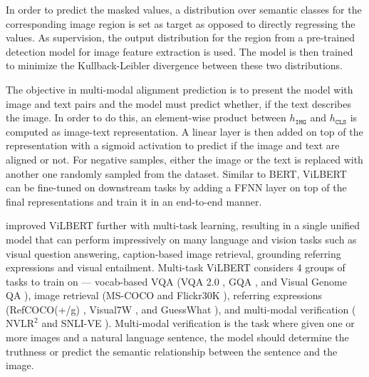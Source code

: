 \documentclass{article}
\begin{document}
In order to predict the masked values, a distribution over semantic classes for the corresponding image region is set as target as opposed to directly regressing the values. As supervision, the output distribution for the region from a pre-trained detection model for image feature extraction is used. The model is then trained to minimize the Kullback-Leibler divergence between these two distributions.

The objective in multi-modal alignment prediction is to present the model with image and text pairs and the model must predict whether, if the text describes the image. In order to do this, an element-wise product between $h_{\mathtt{IMG}}$ and $h_{\mathtt{CLS}}$ is computed as image-text representation. A linear layer is then added on top of the representation with a sigmoid activation to predict if the image and text are aligned or not. For negative samples, either the image or the text is replaced with another one randomly sampled from the dataset. Similar to BERT, ViLBERT can be fine-tuned on downstream tasks by adding a FFNN layer on top of the final representations and train it in an end-to-end manner.

\citet{lu2020multitask} improved ViLBERT further with multi-task learning, resulting in a single unified model that can perform impressively on many language and vision tasks such as visual question answering, caption-based image retrieval, grounding referring expressions and visual entailment. Multi-task ViLBERT considers 4 groups of tasks to train on --- vocab-based VQA (VQA 2.0 \citep{goyal2017vqa2}, GQA \citep{hudson2019gqa}, and Visual Genome QA \citep{krishnavisualgenome}), image retrieval (MS-COCO \citep{coco} and Flickr30K \citep{plummer2015vdg}), referring expressions (RefCOCO(+/g) \citep{kazemzadeh-etal-2014-referitgame, maorefcoco}, Visual7W \citep{zhu2016cvpr}, and GuessWhat \citep{guesswhat_game}), and multi-modal verification ($\text{NVLR}^2$ \citep{suhr-etal-2019-corpus} and  SNLI-VE \citep{xie2018visual}). Multi-modal verification is the task where given one or more images and a natural language sentence, the model should determine the truthness or predict the semantic relationship between the sentence and the image. 
\end{document}
